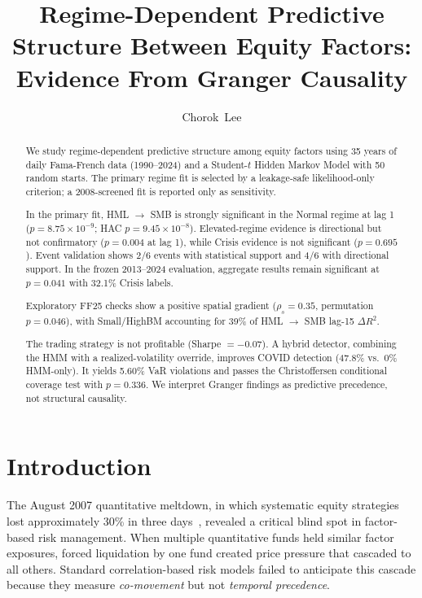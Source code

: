 \documentclass{uai2026}
\title{Regime-Dependent Predictive Structure Between Equity Factors: Evidence From Granger Causality}
\author[1]{Chorok~Lee}
\affil[1]{Korea Advanced Institute of Science and Technology (KAIST)\\
  Daejeon, Republic of Korea}
\begin{document}
\raggedbottom
\maketitle
\begin{abstract}
We study regime-dependent predictive structure among equity factors using 35 years
of daily Fama-French data (1990--2024) and a Student-$t$ Hidden Markov Model
with 50 random starts. The primary regime fit is selected by a leakage-safe
likelihood-only criterion; a 2008-screened fit is reported only as sensitivity.

In the primary fit, HML $\to$ SMB is strongly significant in the Normal regime at
lag 1 ($p = 8.75 \times 10^{-9}$; HAC $p = 9.45 \times 10^{-8}$). Elevated-regime
evidence is directional but not confirmatory ($p = 0.004$ at lag 1), while Crisis
evidence is not significant ($p = 0.695$). Event validation shows 2/6 events with
statistical support and 4/6 with directional support. In the frozen 2013--2024
evaluation, aggregate results remain significant at $p = 0.041$ with 32.1\% Crisis
labels.

Exploratory FF25 checks show a positive spatial gradient ($\rho_s = 0.35$, permutation
$p = 0.046$), with Small\-/HighBM accounting for 39\% of HML $\to$ SMB lag-15
$\Delta R^2$.

The trading strategy is not profitable (Sharpe $=-0.07$).
A hybrid detector, combining the HMM with a realized-volatility override, improves
COVID detection (47.8\% vs.\ 0\% HMM-only).
It yields 5.60\% VaR violations and passes the Christoffersen conditional coverage
test with $p = 0.336$.
We interpret Granger findings as predictive precedence, not structural causality.
\end{abstract}



\section{Introduction}

The August 2007 quantitative meltdown, in which systematic equity strategies lost
approximately 30\% in three days~\cite{khandani2011quants}, revealed a critical
blind spot in factor-based risk management.
When multiple quantitative funds held similar factor exposures, forced liquidation
by one fund created price pressure that cascaded to all others.
Standard correlation-based risk models failed to anticipate this cascade because they
measure \emph{co-movement} but not \emph{temporal precedence}.
\end{document}

